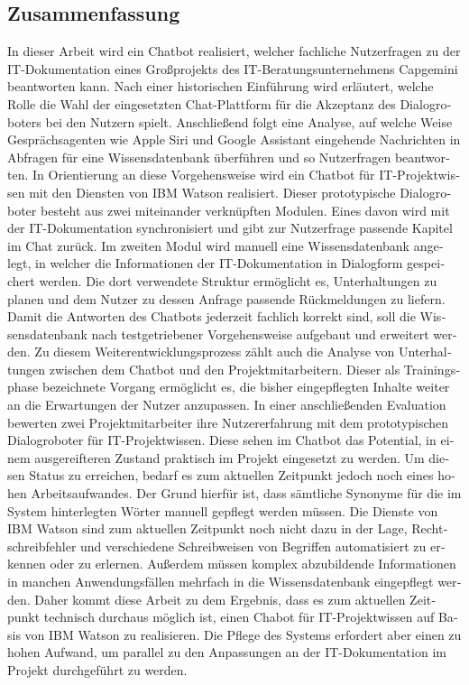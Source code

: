 \begin{otherlanguage}{ngerman}
\chapter*{Zusammenfassung}
In dieser Arbeit wird ein Chatbot realisiert, welcher fachliche Nutzerfragen zu der IT-Dokumentation eines Großprojekts des IT-Beratungsunternehmens Capgemini beantworten kann. Nach einer historischen Einführung wird erläutert, welche Rolle die Wahl der eingesetzten Chat-Plattform für die Akzeptanz des Dialogroboters bei den Nutzern spielt. Anschließend folgt eine Analyse, auf welche Weise Gesprächsagenten wie Apple Siri und Google Assistant eingehende Nachrichten in Abfragen für eine Wissensdatenbank überführen und so Nutzerfragen beantworten. In Orientierung an diese Vorgehensweise wird ein Chatbot für IT-Projektwissen mit den Diensten von IBM Watson realisiert. Dieser prototypische Dialogroboter besteht aus zwei miteinander verknüpften Modulen. Eines davon wird mit der IT-Dokumentation synchronisiert und gibt zur Nutzerfrage passende Kapitel im Chat zurück. Im zweiten Modul wird manuell eine Wissensdatenbank angelegt, in welcher die Informationen der IT-Dokumentation in Dialogform gespeichert werden. Die dort verwendete Struktur ermöglicht es, Unterhaltungen zu planen und dem Nutzer zu dessen Anfrage passende Rückmeldungen zu liefern. Damit die Antworten des Chatbots jederzeit fachlich korrekt sind, soll die Wissensdatenbank nach testgetriebener Vorgehensweise aufgebaut und erweitert werden. Zu diesem Weiterentwicklungsprozess zählt auch die Analyse von Unterhaltungen zwischen dem Chatbot und den Projektmitarbeitern. Dieser als Trainingsphase bezeichnete Vorgang ermöglicht es, die bisher eingepflegten Inhalte weiter an die Erwartungen der Nutzer anzupassen. In einer anschließenden Evaluation bewerten zwei Projektmitarbeiter ihre Nutzererfahrung mit dem prototypischen Dialogroboter für IT-Projektwissen. Diese sehen im Chatbot das Potential, in einem ausgereifteren Zustand praktisch im Projekt eingesetzt zu werden. Um diesen Status zu erreichen, bedarf es zum aktuellen Zeitpunkt jedoch noch eines hohen Arbeitsaufwandes. Der Grund hierfür ist, dass sämtliche Synonyme für die im System hinterlegten Wörter manuell gepflegt werden müssen. Die Dienste von IBM Watson sind zum aktuellen Zeitpunkt noch nicht dazu in der Lage, Rechtschreibfehler und verschiedene Schreibweisen von Begriffen automatisiert zu erkennen oder zu erlernen. Außerdem müssen komplex abzubildende Informationen in manchen Anwendungsfällen mehrfach in die Wissensdatenbank eingepflegt werden. Daher kommt diese Arbeit zu dem Ergebnis, dass es zum aktuellen Zeitpunkt technisch durchaus möglich ist, einen Chabot für IT-Projektwissen auf Basis von IBM Watson zu realisieren. Die Pflege des Systems erfordert aber einen zu hohen Aufwand, um parallel zu den Anpassungen an der IT-Dokumentation im Projekt durchgeführt zu werden.
\end{otherlanguage}
